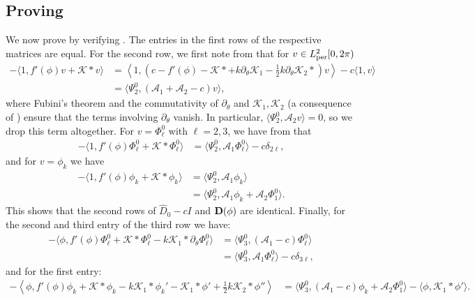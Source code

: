 \documentclass[11pt,leqno]{article}
\numberwithin{equation}{section}
\theoremstyle{definition}
\begin{document}
\subsection{Proving }
We now prove  by verifying . The entries in the first rows of the respective matrices are equal. For the second row, we first note from  that for $ v \in L^{2}_{\rm per}[0,2\pi)$
\begin{align*}
	-\langle1,f'(\phi)v + \mathcal{K}*v \rangle &= \left\langle1,\left(c - f'(\phi) - \mathcal{K}* + k\partial_{\theta}\mathcal{K}_{1} - \frac{1}{2}k\partial_{\theta}\mathcal{K}_{2}*\right)v \right\rangle - c\langle1,v\rangle\\
	&= \langle\Psi_{2}^{0},(\mathcal{A}_{1} + \mathcal{A}_{2} - c)v\rangle,
\end{align*}
where Fubini's theorem and the commutativity of $ \partial_{\theta} $ and $ \mathcal{K}_{1},\mathcal{K}_{2} $ (a consequence of ) ensure that the terms involving $ \partial_{\theta} $ vanish. In particular, $ \langle \Psi_{2}^{0},\mathcal{A}_{2}v \rangle = 0 $, so we drop this term altogether. For $ v = \Phi_{\ell}^{0} $ with $ \ell = 2,3 $, we have from  that
\begin{align*}
	-\langle1,f'(\phi)\Phi_{\ell}^{0} + \mathcal{K}*\Phi_{\ell}^{0} \rangle &= \langle\Psi_{2}^{0},\mathcal{A}_{1}\Phi_{\ell}^{0}\rangle - c\delta_{2\ell},
\end{align*}
and for $ v = \phi_{k} $ we have
\begin{align*}
	-\langle1,f'(\phi)\phi_{k} + \mathcal{K}*\phi_{k} \rangle &= \langle\Psi_{2}^{0},\mathcal{A}_{1}\phi_{k}\rangle\\
	&= \langle\Psi_{2}^{0},\mathcal{A}_{1}\phi_{k} + \mathcal{A}_{2}\Phi_{1}^{0}\rangle.
\end{align*}
This shows that the second rows of $\widehat{D}_0 - cI$ and ${\bf D}(\phi)$ are identical. Finally, for the second and third entry of the third row we have:
\begin{align*}
	-\langle \phi,f'(\phi)\Phi_{\ell}^{0} + \mathcal{K}*\Phi_{\ell}^{0} - k\mathcal{K}_{1}*\partial_{\theta}\Phi_{\ell}^{0}\rangle &= \langle \Psi_{3}^{0},(\mathcal{A}_{1} - c)\Phi_{\ell}^{0}\rangle\\
	&= \langle\Psi_{3}^{0},\mathcal{A}_{1}\Phi_{\ell}^{0}\rangle - c\delta_{3\ell},
\end{align*}
and for the first entry:
\begin{align*}
	-\left\langle \phi,f'(\phi)\phi_{k} + \mathcal{K}*\phi_{k} - k\mathcal{K}_{1}*\phi_{k}' - \mathcal{K}_{1}*\phi' + \frac{1}{2}k\mathcal{K}_{2}*\phi'' \right\rangle &= \langle\Psi_{3}^{0},(\mathcal{A}_{1} - c)\phi_{k} + \mathcal{A}_{2}\Phi_{1}^{0} \rangle - \langle\phi,\mathcal{K}_{1}*\phi'\rangle.
\end{align*}
\end{document}
